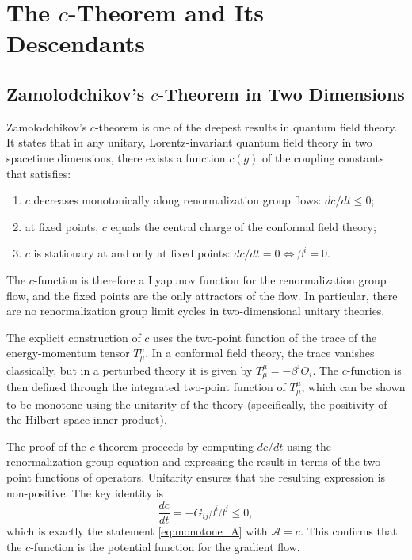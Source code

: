 \documentclass[11pt, twoside, openright]{book}
\theoremstyle{dotted}
\theoremstyle{definition}
\begin{document}
\chapter{The \texorpdfstring{$c$}{c}-Theorem and Its Descendants}
\label{ch:c_theorem}

\section{Zamolodchikov's \texorpdfstring{$c$}{c}-Theorem in Two Dimensions}

Zamolodchikov's $c$-theorem is one of the deepest results in quantum field theory.
It states that in any unitary, Lorentz-invariant quantum field theory in two
spacetime dimensions, there exists a function $c(g)$ of the coupling constants
that satisfies:
\begin{enumerate}[label=(\roman*)]
  \item $c$ decreases monotonically along renormalization group flows: $dc/dt \leq 0$;
  \item at fixed points, $c$ equals the central charge of the conformal field theory;
  \item $c$ is stationary at and only at fixed points: $dc/dt = 0 \iff \beta^i = 0$.
\end{enumerate}
The $c$-function is therefore a Lyapunov function for the renormalization group
flow, and the fixed points are the only attractors of the flow. In particular,
there are no renormalization group limit cycles in two-dimensional unitary theories.

The explicit construction of $c$ uses the two-point function of the trace of the
energy-momentum tensor $T^\mu_\mu$. In a conformal field theory, the trace vanishes
classically, but in a perturbed theory it is given by $T^\mu_\mu = -\beta^i O_i$.
The $c$-function is then defined through the integrated two-point function of
$T^\mu_\mu$, which can be shown to be monotone using the unitarity of the theory
(specifically, the positivity of the Hilbert space inner product).

The proof of the $c$-theorem proceeds by computing $dc/dt$ using the renormalization
group equation and expressing the result in terms of the two-point functions of
operators. Unitarity ensures that the resulting expression is non-positive. The
key identity is
\begin{equation}
  \frac{dc}{dt} = -G_{ij}\beta^i\beta^j \leq 0,
  \label{eq:c_theorem}
\end{equation}
which is exactly the statement \eqref{eq:monotone_A} with $\mathcal{A} = c$.
This confirms that the $c$-function is the potential function for the gradient flow.
\end{document}
